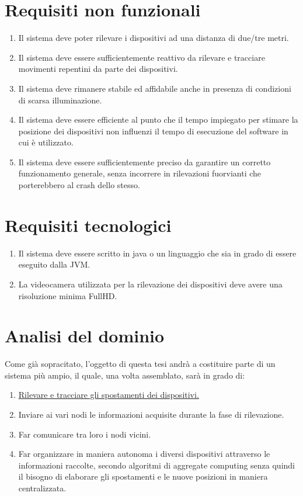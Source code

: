 \documentclass[12pt,a4paper,openright,twoside]{book}
\begin{document}
\section{Requisiti non funzionali} \label{sec:requisiti_non_funzionali}
\begin{enumerate}[label=RNF\arabic*]
	\item Il sistema deve poter rilevare i dispositivi ad una distanza di due/tre metri.
	\item Il sistema deve essere sufficientemente reattivo da rilevare e tracciare movimenti repentini da parte dei dispositivi.
	\item Il sistema deve rimanere stabile ed affidabile anche in presenza di condizioni di scarsa illuminazione.
	\item Il sistema deve essere efficiente al punto che il tempo impiegato per stimare la posizione dei dispositivi non influenzi il tempo di esecuzione del software in cui è utilizzato.
	\item Il sistema deve essere sufficientemente preciso da garantire un corretto funzionamento generale, senza incorrere in rilevazioni fuorvianti che porterebbero al crash dello stesso.
\end{enumerate}
\section{Requisiti tecnologici}
\begin{enumerate}[label=RT\arabic*]
	\item Il sistema deve essere scritto in java o un linguaggio che sia in grado di essere eseguito dalla JVM.
	\item La videocamera utilizzata per la rilevazione dei dispositivi deve avere una risoluzione minima \gls{FullHD}.
\end{enumerate}
\section{Analisi del dominio}
Come già sopracitato, l’oggetto di questa tesi andrà a costituire parte di un sistema più ampio, il quale, una volta assemblato, sarà in grado di:
\begin{enumerate}
	\item \underline{Rilevare e tracciare gli spostamenti dei dispositivi.}
	\item Inviare ai vari nodi le informazioni acquisite durante la fase di rilevazione.
	\item Far comunicare tra loro i nodi vicini.
	\item Far organizzare in maniera autonoma i diversi dispositivi attraverso le informazioni raccolte, secondo algoritmi di aggregate computing senza quindi il bisogno di elaborare gli spostamenti e le nuove posizioni in maniera centralizzata.
\end{enumerate}
\end{document}
